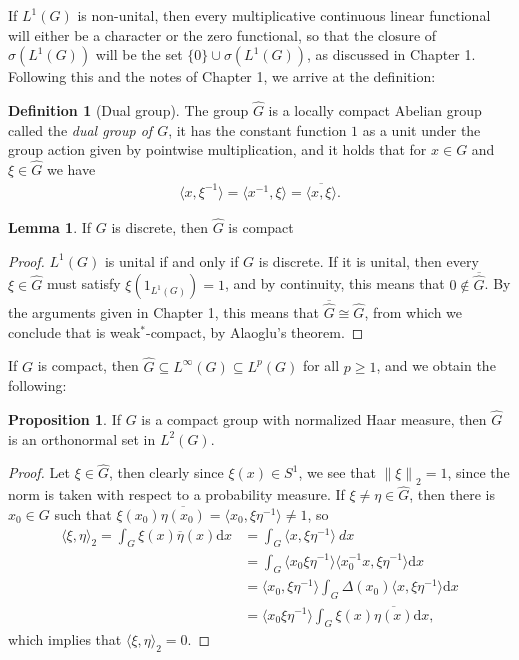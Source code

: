 \documentclass[10pt,twoside,openany,final]{memoir}
\theoremstyle{definition}
\newtheorem{lemma}[theorem]{Lemma}
\newtheorem{proposition}[theorem]{Proposition}
\newtheorem{definition}[theorem]{Definition}
\theoremstyle{Break}
\newcommand{\lv}{\left\lVert}
\newcommand{\rv}{\right\rVert}
\newcommand{\G}{\widehat{G}}
\renewcommand{\d}{\mathrm{d}}
\begin{document}
If $L^1(G)$ is non-unital, then every multiplicative continuous linear functional will either be a character or the zero functional, so that the closure of $\sigma(L^1(G))$ will be the set $\{0\} \cup \sigma(L^1(G))$, as discussed in Chapter 1. Following this and the notes of Chapter 1, we arrive at the definition:
\begin{definition}[Dual group]
	The group $\widehat{G}$ is a locally compact Abelian group called the \emph{dual group of $G$}, it has the constant function $1$ as a unit under the group action given by pointwise multiplication, and it holds that for $x \in G$ and $\xi \in \widehat{G}$ we have
	\begin{align*}
		\langle x,\xi^{-1}\rangle = \langle x^{-1}, \xi \rangle = \overline{\langle x, \xi \rangle}.	
	\end{align*}
\end{definition}
\begin{lemma}
	If $G$ is discrete, then $\widehat{G}$ is compact
	\label{lemma4.4}
\end{lemma}
\begin{proof}
	$L^1(G)$ is unital if and only if $G$ is discrete. If it is unital, then every $\xi \in \G$ must satisfy $\xi(1_{L^1(G)})=1$, and by continuity, this means that $0 \not \in \overline{\G}$. By the arguments given in Chapter 1, this means that $\overline{\G}\cong\G$, from which we conclude that is weak$^*$-compact, by Alaoglu's theorem.
\end{proof}
If $G$ is compact, then $\widehat{G} \subseteq L^\infty(G) \subseteq L^p(G)$ for all $p \geq 1$, and we obtain the following:
\begin{proposition}
	If $G$ is a compact group with normalized Haar measure, then $\widehat{G}$ is an orthonormal set in $L^2(G)$.
	\label{4.3}
\end{proposition}
\begin{proof}
	Let $\xi \in \G$, then clearly since $\xi(x) \in S^1$, we see that $\lv \xi \rv_2=1$, since the norm is taken with respect to a probability measure. If $\xi\neq \eta \in \widehat{G}$, then there is $x_0 \in G$ such that $\xi(x_0)\overline{\eta(x_0)}=\langle x_0,\xi \eta^{-1}\rangle \neq 1$, so
	\begin{align*}
		\langle \xi,\eta\rangle_2=\int_G \xi(x) \overline{\eta}(x) \d x &= \int_G \langle x,\xi \eta^{-1}\rangle \ d x \\
		&=\int_G \langle x_0 \xi \eta^{-1} \rangle \langle x_0^{-1}x, \xi \eta^{-1}\rangle \d x \\
		&= \langle x_0 , \xi \eta^{-1}\rangle \int_G \Delta(x_0)\langle x , \xi \eta^{-1}\rangle \d x \\
		&= \langle x_0 \xi \eta^{-1}\rangle \int_G \xi(x) \overline{\eta(x)} \d x,
	\end{align*}
	which implies that $\langle \xi, \eta \rangle_2 = 0$.
\end{proof}
\end{document}
